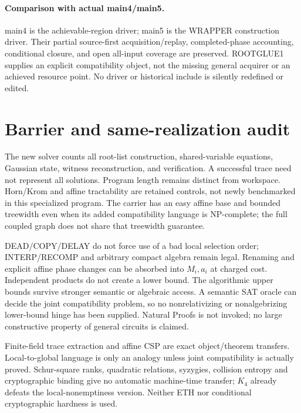 \documentclass[11pt]{article}
\begin{document}
\paragraph{Comparison with actual main4/main5.}
main4 is the achievable-region driver; main5 is the WRAPPER construction
driver. Their partial source-first acquisition/replay, completed-phase
accounting, conditional closure, and open all-input coverage are preserved.
ROOTGLUE1 supplies an explicit compatibility object, not the missing general
acquirer or an achieved resource point. No driver or historical include is
silently redefined or edited.

\section{Barrier and same-realization audit}
The new solver counts all root-list construction, shared-variable equations,
Gaussian state, witness reconstruction, and verification. A successful trace
need not represent all solutions. Program length remains distinct from
workspace. Horn/Krom and affine tractability are retained controls, not newly
benchmarked in this specialized program. The carrier has an easy affine
base and bounded treewidth even when its added compatibility language is
NP-complete; the full coupled graph does not share that treewidth guarantee.

DEAD/COPY/DELAY do not force use of a bad local selection order;
INTERP/RECOMP and arbitrary compact algebra remain legal. Renaming and
explicit affine phase changes can be absorbed into $M_i,a_i$ at charged cost.
Independent products do not create a lower bound. The algorithmic upper
bounds survive stronger semantic or algebraic access. A semantic SAT oracle
can decide the joint compatibility problem, so no nonrelativizing or
nonalgebrizing lower-bound hinge has been supplied. Natural Proofs is not
invoked; no large constructive property of general circuits is claimed.

Finite-field trace extraction and affine CSP are exact object/theorem
transfers. Local-to-global language is only an analogy unless joint
compatibility is actually proved. Schur-square ranks, quadratic relations,
syzygies, collision entropy and cryptographic binding give no automatic
machine-time transfer; $K_4$ already defeats the local-nonemptiness version.
Neither ETH nor conditional cryptographic hardness is used.
\end{document}
